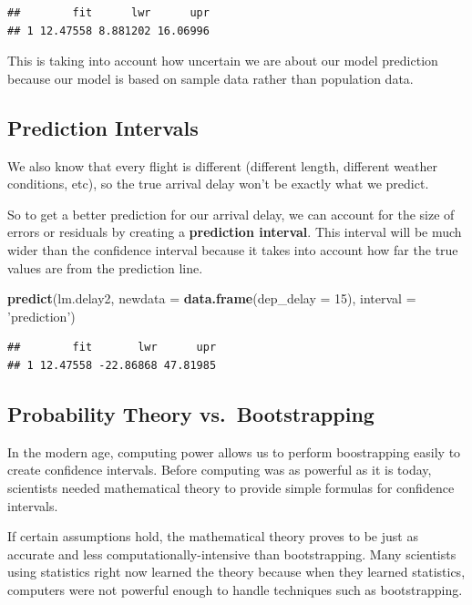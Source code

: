 \documentclass[
]{book}
\newenvironment{Shaded}{\begin{snugshade}}{\end{snugshade}}
\newcommand{\DataTypeTok}[1]{\textcolor[rgb]{0.13,0.29,0.53}{#1}}
\newcommand{\DecValTok}[1]{\textcolor[rgb]{0.00,0.00,0.81}{#1}}
\newcommand{\KeywordTok}[1]{\textcolor[rgb]{0.13,0.29,0.53}{\textbf{#1}}}
\newcommand{\NormalTok}[1]{#1}
\newcommand{\StringTok}[1]{\textcolor[rgb]{0.31,0.60,0.02}{#1}}
\begin{document}
\begin{verbatim}
##        fit      lwr      upr
## 1 12.47558 8.881202 16.06996
\end{verbatim}

This is taking into account how uncertain we are about our model prediction because our model is based on sample data rather than population data.

\hypertarget{prediction-intervals}{%
\subsection{Prediction Intervals}\label{prediction-intervals}}

We also know that every flight is different (different length, different weather conditions, etc), so the true arrival delay won't be exactly what we predict.

So to get a better prediction for our arrival delay, we can account for the size of errors or residuals by creating a \textbf{prediction interval}. This interval will be much wider than the confidence interval because it takes into account how far the true values are from the prediction line.

\begin{Shaded}
\begin{Highlighting}[]
\KeywordTok{predict}\NormalTok{(lm.delay2, }\DataTypeTok{newdata =} \KeywordTok{data.frame}\NormalTok{(}\DataTypeTok{dep_delay =} \DecValTok{15}\NormalTok{), }\DataTypeTok{interval =} \StringTok{'prediction'}\NormalTok{)}
\end{Highlighting}
\end{Shaded}

\begin{verbatim}
##        fit       lwr      upr
## 1 12.47558 -22.86868 47.81985
\end{verbatim}

\hypertarget{probability-theory-vs.-bootstrapping}{%
\subsection{Probability Theory vs.~Bootstrapping}\label{probability-theory-vs.-bootstrapping}}

In the modern age, computing power allows us to perform boostrapping easily to create confidence intervals. Before computing was as powerful as it is today, scientists needed mathematical theory to provide simple formulas for confidence intervals.

If certain assumptions hold, the mathematical theory proves to be just as accurate and less computationally-intensive than bootstrapping. Many scientists using statistics right now learned the theory because when they learned statistics, computers were not powerful enough to handle techniques such as bootstrapping.
\end{document}
